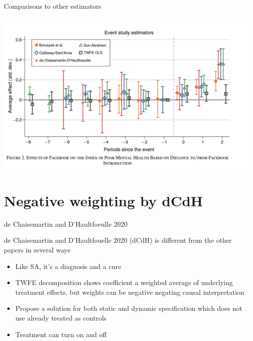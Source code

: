 \documentclass{beamer}
\begin{document}
\begin{frame}{Comparisons to other estimators}
\begin{center}
\includegraphics[scale=0.35]{./lecture_includes/facebook_3}
\end{center}
\end{frame}

\section{Negative weighting by dCdH}


\begin{frame}{de Chaisemartin and D'Haultfoeulle 2020}

de Chaisemartin and D'Haultfouelle 2020 (dCdH) is different from the other papers in several ways
	\begin{itemize}
	\item Like SA, it's a diagnosis and a cure
	\item TWFE decomposition shows coefficient a weighted average of underlying treatment effects, but weights can be negative negating causal interpretation
	\item Propose a solution for both static and dynamic specification which does not use already treated as controls
	\item Treatment can turn on and off
	\end{itemize}

\end{frame}
\end{document}
